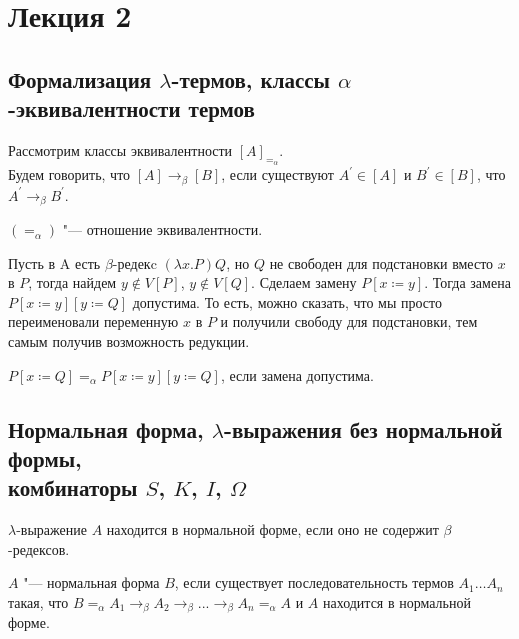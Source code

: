 \section{Лекция 2}

\subsection{Формализация $\lambda$-термов, классы $\alpha$-эквивалентности термов}

\begin{definition}
	Рассмотрим классы эквивалентности $[A]_{=_{\alpha}}$. \\
	Будем говорить, что $[A]\to_{\beta}[B]$, если существуют $A^{'}\in [A]$ и $B^{'} \in [B]$, что $A^{'}\to_{\beta}B^{'}$.
\end{definition}

\begin{lemma}
	$(=_{\alpha})$ "--- отношение эквивалентности.
\end{lemma}

Пусть в A есть $\beta$-редекc $(\lambda{}x.P)Q$, но $Q$ не свободен для подстановки вместо $x$ в $P$,
тогда найдем $y\notin V[P]$, $y\notin V[Q]$. Сделаем замену $P[x\coloneqq{}y]$.
Тогда замена $P[x\coloneqq{}y][y\coloneqq{}Q]$ допустима. То есть, можно сказать, что мы просто переименовали переменную $x$ в $P$ и получили свободу для подстановки, тем самым получив возможность редукции.

\begin{lemma}
	$P[x\coloneqq{}Q]=_{\alpha}P[x\coloneqq{}y][y\coloneqq{}Q]$, если замена допустима.
\end{lemma}

\subsection{Нормальная форма, $\lambda$-выражения без нормальной формы, \\комбинаторы $S$, $K$, $I$, $\Omega$}

\begin{definition}
	$\lambda$-выражение $A$ находится в нормальной форме, если оно не содержит $\beta$-редексов.
\end{definition}

\begin{definition}
	$A$ "--- нормальная форма $B$, если существует последовательность термов $A_{1} \dots A_{n}$ такая, что $B=_{\alpha}A_{1}\to_{\beta}A_{2}\to_{\beta}...\to_{\beta}A_{n}=_{\alpha}A$ и $A$ находится в нормальной форме.
\end{definition}

